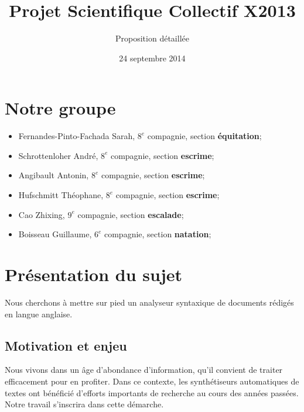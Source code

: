 \documentclass{article}           %
\title{Projet Scientifique Collectif X2013}     %
\author{Proposition détaillée}        %
\date{24 septembre 2014}
\begin{document}

\maketitle                        %


\newpage

\tableofcontents			
\newpage

\section*{Notre groupe}

\begin{itemize}
 \item Fernandes-Pinto-Fachada Sarah, \textbf{$8^e$} compagnie, section \textbf{équitation};
 \item Schrottenloher André, \textbf{$8^e$} compagnie, section \textbf{escrime};
 \item Angibault Antonin, \textbf{$8^e$} compagnie, section \textbf{escrime};
 \item Hufschmitt Théophane, \textbf{$8^e$} compagnie, section \textbf{escrime};
 \item Cao Zhixing, \textbf{$9^e$} compagnie, section \textbf{escalade};
 \item Boisseau Guillaume, \textbf{$6^e$} compagnie, section \textbf{natation};
\end{itemize}


\section{Présentation du sujet} %

Nous cherchons à mettre sur pied un analyseur syntaxique de documents rédigés en langue anglaise.

\subsection{Motivation et enjeu}
Nous vivons dans un \^{a}ge d'abondance d'information, qu'il convient de traiter efficacement pour en profiter. Dans ce contexte, les synthétiseurs automatiques de textes ont bénéficié d'efforts importants de recherche au cours des années passées. Notre travail s'inscrira dans cette démarche.
\end{document}
